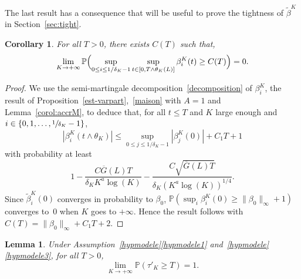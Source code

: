 \documentclass[JEP,XML,SOM,Unicode,published]{cedram}
\theoremstyle{plain}
\newtheorem{lemma}[theorem]{Lemma}
\newtheorem{corollary}[theorem]{Corollary}
\theoremstyle{remark}
\begin{document}
The last result has a consequence that will be useful to prove the tightness of $\widetilde{\beta}^K$ in Section~\ref{sec:tight}.

\begin{corollary}
\label{lem:upper-bound}
For all $T>0$, there exists $C(T)$ such that,
\[
\lim_{K\to+\infty}\mathbb{P}\Bigl(\sup_{0\leq i\leq 1/
\delta_K-1}\sup_{t\in[0,T\wedge\theta_K(L)]}\beta^K_i(t)\geq C(T)\Bigr)=0.
\]
\end{corollary}

\begin{proof}
We use the semi-martingale decomposition~\eqref{decomposition} of $\beta^K_i$, the result of Proposition~\ref{est-varpart},~\eqref{maison} with $A=1$ and Lemma~\ref{corol:accrM}, to deduce that, for all $t\leq T$ {and $K$ large enough} and $i \in \{0, 1,\dots, \sfrac{1}{\delta_K}-1\}$,
\[
|\beta^K_i(t\wedge\theta_K)|\leq \sup_{0\leq j\leq 1/\delta_K-1}|\beta^K_j(0)|+C_1T+1
\]
with probability at least
\[
1-\frac{C\overline{G}(L)T}{\delta_K K^a\log(K)} -\frac{C\sqrt{\overline{G}(L)T}}{\delta_K(K^a \log(K))^{1/4}}.
\]
Since $\widetilde{\beta}^K_i(0)$ converges in probability to $\beta_0$, $\mathbb{P}(\sup_i \beta^K_i(0)\geq \|\beta_0\|_\infty+1)$ converges to~$0$ when $K$ goes to $+\infty$. Hence the result follows with $C(T)=\|\beta_0\|_\infty+C_1T+2$.
\end{proof}

\label{sec:control-incr}

\begin{lemma}\label{lem:lower-bound} Under Assumption~\ref{hypmodele}\eqref{hypmodele1} and~\ref{hypmodele}\eqref{hypmodele3}, for all $T>0$,
\[
\lim_{K\to+\infty}\mathbb{P}(\tau'_K\geq T) =1.
\]
\end{lemma}
\end{document}
